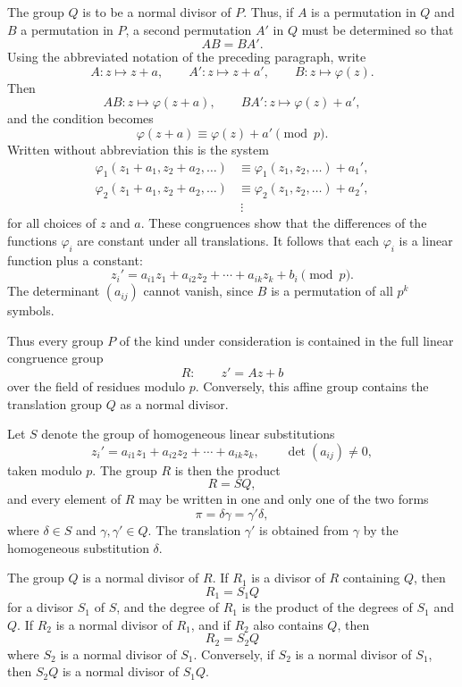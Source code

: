 \documentclass[11pt,a4paper]{book}
\begin{document}
The group \(Q\) is to be a normal divisor of \(P\).  Thus, if \(A\) is a permutation in \(Q\) and \(B\) a permutation in \(P\), a second permutation \(A'\) in \(Q\) must be determined so that
\[
 AB=BA'.
\]
Using the abbreviated notation of the preceding paragraph, write
\[
 A:z\mapsto z+a,\qquad
 A':z\mapsto z+a',\qquad
 B:z\mapsto \varphi(z).
\]
Then
\[
 AB:z\mapsto \varphi(z+a),\qquad
 BA':z\mapsto \varphi(z)+a',
\]
and the condition becomes
\[
 \varphi(z+a)\equiv \varphi(z)+a'\pmod p.
\]
Written without abbreviation this is the system
\[
\begin{aligned}
 \varphi_1(z_1+a_1,z_2+a_2,\ldots)
     &\equiv \varphi_1(z_1,z_2,\ldots)+a_1',\\
 \varphi_2(z_1+a_1,z_2+a_2,\ldots)
     &\equiv \varphi_2(z_1,z_2,\ldots)+a_2',\\
 &\ \vdots
\end{aligned}
\]
for all choices of \(z\) and \(a\).  These congruences show that the differences of the functions \(\varphi_i\) are constant under all translations.  It follows that each \(\varphi_i\) is a linear function plus a constant:
\[
 z_i'=a_{i1}z_1+a_{i2}z_2+\cdots+a_{ik}z_k+b_i\pmod p.
\]
The determinant \((a_{ij})\) cannot vanish, since \(B\) is a permutation of all \(p^k\) symbols.

Thus every group \(P\) of the kind under consideration is contained in the full linear congruence group
\[
 R:\qquad
 z'=Az+b
\]
over the field of residues modulo \(p\).  Conversely, this affine group contains the translation group \(Q\) as a normal divisor.

Let \(S\) denote the group of homogeneous linear substitutions
\[
 z_i'=a_{i1}z_1+a_{i2}z_2+\cdots+a_{ik}z_k,\qquad
 \det(a_{ij})\ne0,
\]
taken modulo \(p\).  The group \(R\) is then the product
\[
 R=SQ,
\]
and every element of \(R\) may be written in one and only one of the two forms
\[
 \pi=\delta\gamma=\gamma'\delta,
\]
where \(\delta\in S\) and \(\gamma,\gamma'\in Q\).  The translation \(\gamma'\) is obtained from \(\gamma\) by the homogeneous substitution \(\delta\).

The group \(Q\) is a normal divisor of \(R\).  If \(R_1\) is a divisor of \(R\) containing \(Q\), then
\[
 R_1=S_1Q
\]
for a divisor \(S_1\) of \(S\), and the degree of \(R_1\) is the product of the degrees of \(S_1\) and \(Q\).  If \(R_2\) is a normal divisor of \(R_1\), and if \(R_2\) also contains \(Q\), then
\[
 R_2=S_2Q
\]
where \(S_2\) is a normal divisor of \(S_1\).  Conversely, if \(S_2\) is a normal divisor of \(S_1\), then \(S_2Q\) is a normal divisor of \(S_1Q\).
\end{document}
